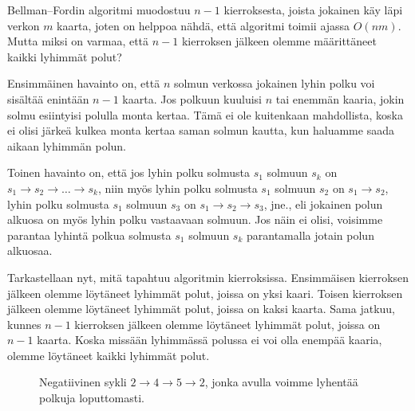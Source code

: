 Bellman–Fordin algoritmi muodostuu $n-1$ kierroksesta,
joista jokainen käy läpi verkon $m$ kaarta,
joten on helppoa nähdä, että algoritmi toimii ajassa $O(nm)$.
Mutta miksi on varmaa, että $n-1$ kierroksen jälkeen olemme
määrittäneet kaikki lyhimmät polut?

Ensimmäinen havainto on,
että $n$ solmun verkossa jokainen lyhin polku voi
sisältää enintään $n-1$ kaarta.
Jos polkuun kuuluisi $n$ tai enemmän kaaria,
jokin solmu esiintyisi polulla monta kertaa.
Tämä ei ole kuitenkaan mahdollista,
koska ei olisi järkeä kulkea monta kertaa saman solmun kautta,
kun haluamme saada aikaan lyhimmän polun.

Toinen havainto on, että jos lyhin polku solmusta $s_1$ solmuun $s_k$ on
$s_1 \rightarrow s_2 \rightarrow \dots \rightarrow s_k$,
niin myös lyhin polku solmusta $s_1$ solmuun $s_2$ on $s_1 \rightarrow s_2$,
lyhin polku solmusta $s_1$ solmuun $s_3$ on $s_1 \rightarrow s_2 \rightarrow s_3$, jne.,
eli jokainen polun alkuosa on myös lyhin polku vastaavaan solmuun.
Jos näin ei olisi, voisimme parantaa lyhintä polkua solmusta $s_1$ solmuun $s_k$
parantamalla jotain polun alkuosaa.

Tarkastellaan nyt, mitä tapahtuu algoritmin kierroksissa.
Ensimmäisen kierroksen jälkeen olemme löytäneet lyhimmät polut,
joissa on yksi kaari.
Toisen kierroksen jälkeen olemme löytäneet lyhimmät polut,
joissa on kaksi kaarta.
Sama jatkuu, kunnes $n-1$ kierroksen jälkeen olemme löytäneet
lyhimmät polut, joissa on $n-1$ kaarta.
Koska missään lyhimmässä polussa ei voi olla enempää kaaria,
olemme löytäneet kaikki lyhimmät polut.

\begin{figure}
\center
\begin{center}
\end{center}
\caption{Negatiivinen sykli $2 \rightarrow 4 \rightarrow 5 \rightarrow 2$,
jonka avulla voimme lyhentää polkuja loputtomasti.}
\label{fig:belsyk}
\end{figure}

